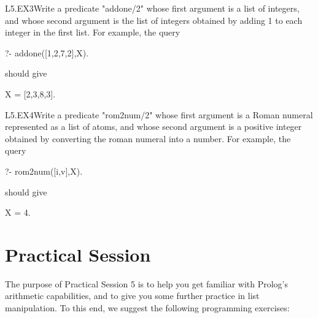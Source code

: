 \clearpage
\begin{LPNexercise}{L5.EX3}Write a predicate
"addone/2" whose first argument is a list of integers, and whose
second argument is the list of integers obtained by adding 1 to each
integer in the first list.  For example, the query
\begin{LPNcodedisplay}
?- addone([1,2,7,2],X).
\end{LPNcodedisplay}
should give
\begin{LPNcodedisplay}
X = [2,3,8,3].
\end{LPNcodedisplay}
\end{LPNexercise}

\begin{LPNexercise}{L5.EX4}Write a predicate
"rom2num/2" whose first argument is a Roman numeral represented as a list of atoms, and whose
second argument is a positive integer obtained by converting the roman numeral into a number.
For example, the query
\begin{LPNcodedisplay}
?- rom2num([i,v],X).
\end{LPNcodedisplay}
should give
\begin{LPNcodedisplay}
X = 4.
\end{LPNcodedisplay}
\end{LPNexercise}


\section{Practical Session}\label{SEC.L5.PRAXIS}



The purpose of Practical Session 5 is to help you get familiar with
Prolog's arithmetic capabilities, and to give you some further
practice in list manipulation. To this end, we suggest the following
programming exercises:

